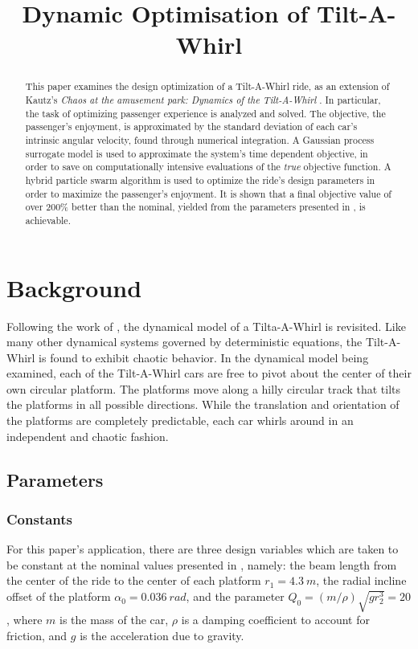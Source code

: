 \documentclass{article}
\title{Dynamic Optimisation of Tilt-A-Whirl}
\begin{document}
\maketitle

\begin{abstract}
This paper examines the design optimization of a Tilt-A-Whirl ride, as an extension of Kautz's \textit{Chaos at the amusement park: Dynamics of the Tilt-A-Whirl} \cite{Kautz1994}. In particular, the task of optimizing passenger experience is analyzed and solved. The objective, the passenger's enjoyment, is approximated by the standard deviation of each car's intrinsic angular velocity, found through numerical integration. A Gaussian process surrogate model is used to approximate the system's time dependent objective, in order to save on computationally intensive evaluations of the \textit{true} objective function. A hybrid particle swarm algorithm is used to optimize the ride's design parameters in order to maximize the passenger's enjoyment. It is shown that a final objective value of over 200\% better than the nominal, yielded from the parameters presented in \cite{Kautz1994}, is achievable.
\end{abstract}
    

\tableofcontents
\listoffigures
\lstlistoflistings

\section{Background}
Following the work of \cite{Kautz1994}, the dynamical model of a Tilta-A-Whirl is revisited. Like many other dynamical systems governed by deterministic equations, the Tilt-A-Whirl is found to exhibit chaotic behavior. In the dynamical model being examined, each of the Tilt-A-Whirl cars are free to pivot about the center of their own circular platform. The platforms move along a hilly circular track that tilts the platforms in all possible directions. While the translation and orientation of the platforms are completely predictable, each car whirls around in an independent and chaotic fashion. 

\subsection{Parameters} \label{sec:param}
\subsubsection{Constants}
For this paper's application, there are three design variables which are taken to be constant at the nominal values presented in \cite{Kautz1994}, namely: the beam length from the center of the ride to the center of each platform $r_1=4.3~m$, the radial incline offset of the platform $\alpha_0 = 0.036~rad$, and the parameter $Q_0 = \left(m/\rho\right)\sqrt{gr_2^3} = 20$, where $m$ is the mass of the car, $\rho$ is a damping coefficient to account for friction, and $g$ is the acceleration due to gravity.
\end{document}
